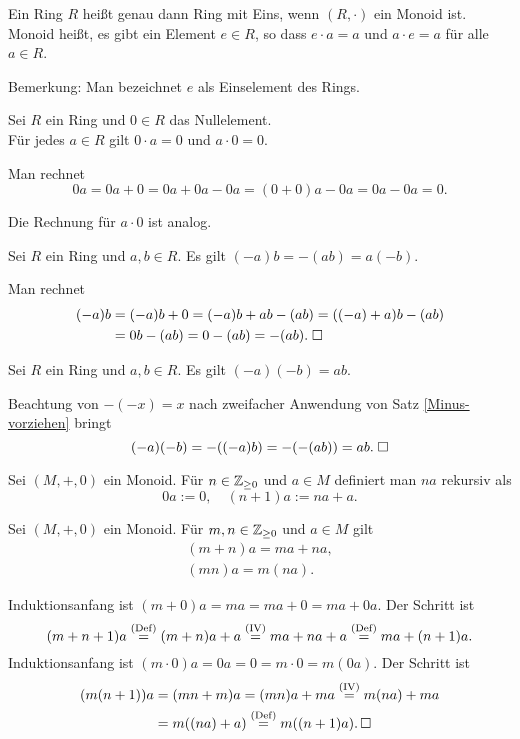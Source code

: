 \begin{Definition}
Ein Ring $R$ heißt genau dann Ring mit Eins, wenn $(R,\cdot)$ ein
Monoid ist. Monoid heißt, es gibt ein Element $e\in R$, so dass
$e\cdot a = a$ und $a\cdot e = a$ für alle $a\in R$.
\end{Definition}
Bemerkung: Man bezeichnet $e$ als Einselement des Rings.

\begin{Satz}
Sei $R$ ein Ring und $0\in R$ das Nullelement.\\
Für jedes $a\in R$ gilt $0\cdot a = 0$ und $a\cdot 0 = 0$.
\end{Satz}
\begin{Beweis} Man rechnet
\[0a = 0a+0 = 0a+0a-0a = (0+0)a-0a = 0a-0a = 0.\]
\end{Beweis}
Die Rechnung für $a\cdot 0$ ist analog.\;\qedsymbol

\begin{Satz}\label{Minus-vorziehen}
Sei $R$ ein Ring und $a,b\in R$. Es gilt $(-a)b = -(ab) = a(-b)$.
\end{Satz}
\begin{Beweis}
Man rechnet
\begin{align*}
(-a)b &= (-a)b+0 = (-a)b+ab-(ab) = ((-a)+a)b-(ab)\\
&= 0b-(ab) = 0-(ab) = -(ab).\;\square
\end{align*}
\end{Beweis}

\begin{Satz}\newlinefirst
Sei $R$ ein Ring und $a,b\in R$. Es gilt
$(-a)(-b) = ab$.
\end{Satz}
Beachtung von $-(-x)=x$ nach zweifacher Anwendung von
Satz \ref{Minus-vorziehen} bringt
\[(-a)(-b) = -((-a)b) = -(-(ab)) = ab.\;\square\]

\begin{Definition}
Sei $(M,+,0)$ ein Monoid. Für $n\in\mathbb Z_{\ge 0}$ und $a\in M$ definiert
man $na$ rekursiv als
\[0a := 0,\quad (n+1)a := na + a.\]
\end{Definition}

\begin{Satz}
Sei $(M,+,0)$ ein Monoid. Für $m,n\in\mathbb Z_{\ge 0}$ und $a\in M$ gilt
\begin{gather}
(m+n)a = ma + na,\\
(mn)a = m(na).
\end{gather}
\end{Satz}
\begin{Beweis}
Induktionsanfang ist $(m+0)a = ma = ma+0 = ma + 0a$. Der Schritt ist%
\[(m+n+1)a \stackrel{\mathrm{(Def)}}{=} (m+n)a + a
\stackrel{\mathrm{(IV)}}{=} ma+na + a
\stackrel{\mathrm{(Def)}}{=} ma + (n+1)a.\]
Induktionsanfang ist $(m\cdot 0)a = 0a = 0 = m\cdot 0 = m(0a)$.
Der Schritt ist
\begin{align*}
(m(n+1))a &= (mn+m)a = (mn)a+ma \stackrel{\mathrm{(IV)}}{=} m(na)+ma\\
&= m((na)+a) \stackrel{\mathrm{(Def)}}{=}
m((n+1)a).\,\square
\end{align*}
\end{Beweis}

